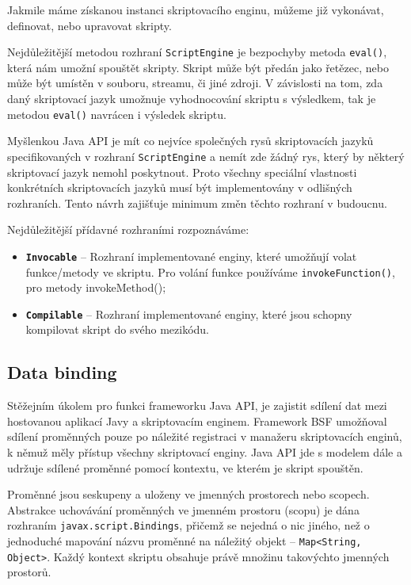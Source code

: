Jakmile máme získanou instanci skriptovacího enginu, můžeme již vykonávat, definovat, nebo upravovat skripty.

Nejdůležitější metodou rozhraní \texttt{ScriptEngine} je bezpochyby metoda \texttt{eval()}, která nám umožní spouštět skripty. Skript může být předán jako řetězec, nebo může být umístěn v souboru, streamu, či jiné zdroji. V závislosti na tom, zda daný skriptovací jazyk umožnuje vyhodnocování skriptu s výsledkem, tak je metodou \texttt{eval()} navrácen i výsledek skriptu.

Myšlenkou Java API je mít co nejvíce společných rysů skriptovacích jazyků specifikovaných v rozhraní \texttt{ScriptEngine} a nemít zde žádný rys, který by některý skriptovací jazyk nemohl poskytnout. Proto všechny speciální vlastnosti konkrétních skriptovacích jazyků musí být implementovány v odlišných rozhraních. Tento návrh zajišťuje minimum změn těchto rozhraní v budoucnu. 

\bigskip \noindent Nejdůležitější přídavné rozhraními rozpoznáváme:

\begin{itemize}
  \item \textbf{\texttt{Invocable}} -- Rozhraní implementované enginy, které umožňují volat funkce/metody ve skriptu. Pro volání funkce používáme \texttt{invokeFunction()}, pro metody invokeMethod();
  \item \textbf{\texttt{Compilable}} -- Rozhraní implementované enginy, které jsou schopny kompilovat skript do svého mezikódu.
\end{itemize}

\subsection{Data binding}
\label{Chapter.JavaScriptInJavaAnalysis.ScriptingJavaAPI.DataBinding}

Stěžejním úkolem pro funkci frameworku Java API, je zajistit sdílení dat mezi hostovanou aplikací Javy a skriptovacím enginem. Framework BSF umožňoval sdílení proměnných pouze po náležité registraci v manažeru skriptovacích enginů, k němuž měly přístup všechny skriptovací enginy. Java API jde s modelem dále a udržuje sdílené proměnné pomocí kontextu, ve kterém je skript spouštěn.

Proměnné jsou seskupeny a uloženy ve jmenných prostorech nebo scopech. Abstrakce uchovávání proměnných ve jmenném prostoru (scopu) je dána rozhraním \texttt{javax.script.Bindings}, přičemž se nejedná o nic jiného, než o jednoduché mapování názvu proměnné na náležitý objekt -- \texttt{Map<String, Object>}. Každý kontext skriptu obsahuje právě množinu takovýchto jmenných prostorů.


